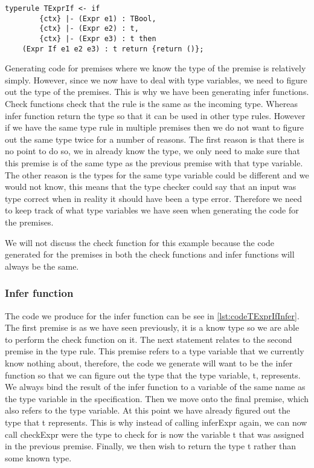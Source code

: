\begin{lstlisting}[caption = Type rule for if expression expression involving type variables, label=lst:jetSTLCIfExpr]
typerule TExprIf <- if 
        {ctx} |- (Expr e1) : TBool, 
        {ctx} |- (Expr e2) : t, 
        {ctx} |- (Expr e3) : t then 
    (Expr If e1 e2 e3) : t return {return ()};
\end{lstlisting}

Generating code for premises where we know the type of the premise is relatively simply.
However, since we now have to deal with type variables, we need to figure out the type of the premises. 
This is why we have been generating infer functions.
Check functions check that the rule is the same as the incoming type.
Whereas infer function return the type so that it can be used in other type rules.
However if we have the same type rule in multiple premises then we do not want to figure out the same type twice for a number of reasons.
The first reason is that there is no point to do so, we in already know the type, we only need to make sure that this premise is of the same type as the previous premise with that type variable.
The other reason is the types for the same type variable could be different and we would not know, this means that the type checker could say that an input was type correct when in reality it should have been a type error.
Therefore we need to keep track of what type variables we have seen when generating the code for the premises.

We will not discuss the check function for this example because the code generated for the premises in both the check functions and infer functions will always be the same.

\subsubsection{Infer function}
The code we produce for the infer function can be see in \autoref{lst:codeTExprIfInfer}.
The first premise is as we have seen previously, it is a know type so we are able to perform the check function on it.
The next statement relates to the second premise in the type rule.
This premise refers to a type variable that we currently know nothing about, therefore, the code we generate will want to be the infer function so that we can figure out the type that the type variable, t, represents.
We always bind the result of the infer function to a variable of the same name as the type variable in the specification.
Then we move onto the final premise, which also refers to the type variable.
At this point we have already figured out the type that t represents.
This is why instead of calling inferExpr again, we can now call checkExpr were the type to check for is now the variable t that was assigned in the previous premise.
Finally, we then wish to return the type t rather than some known type.

